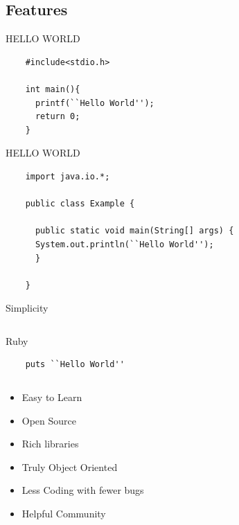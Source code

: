 \documentclass[xcolor=svgnames]{beamer}
\begin{document}
\subsection{Features}
\label{sub:Features}
\begin{frame}[fragile]{HELLO WORLD}
\transwipe
  \transboxout
  \begin{verbatim}
    #include<stdio.h>

    int main(){
      printf(``Hello World'');
      return 0;
    }
  \end{verbatim}
\end{frame}
\begin{frame}[fragile]{HELLO WORLD}
 \begin{verbatim}
    import java.io.*;

    public class Example {

      public static void main(String[] args) {
      System.out.println(``Hello World'');
      }

    }
  \end{verbatim}
\end{frame}

\begin{frame}[fragile]{Simplicity}
\transwipe
\begin{columns}[c]
    \column{1.5in}
\begin{alertblock}{Ruby}
  \begin{verbatim}
    puts ``Hello World''
  \end{verbatim}
\end{alertblock}
    \column{3in}
\end{columns}
\end{frame}
\begin{frame}
\transwipe
  \begin{itemize}
	  \item \alert<+>{Easy to Learn}
	  \item \alert<+>{Open Source}
	  \item \alert<+>{Rich libraries}
	  \item \alert<+>{Truly Object Oriented}
	  \item \alert<+>{Less Coding with fewer bugs}
	  \item \alert<+>{Helpful Community}
\end{itemize}
\end{frame}
\end{document}
